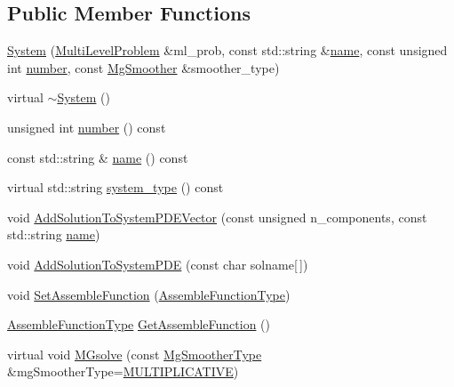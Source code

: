 \subsection*{Public Member Functions}
\begin{DoxyCompactItemize}
\item 
\mbox{\hyperlink{classfemus_1_1_system_ae4a9d3c1f17c10f42aa0935499a080cf}{System}} (\mbox{\hyperlink{classfemus_1_1_multi_level_problem}{Multi\+Level\+Problem}} \&ml\+\_\+prob, const std\+::string \&\mbox{\hyperlink{classfemus_1_1_system_a1a007c176529dae649887bbd1cb46103}{name}}, const unsigned int \mbox{\hyperlink{classfemus_1_1_system_a28f5c7f6286dd597ae28a8923c8dca11}{number}}, const \mbox{\hyperlink{_mg_smoother_enum_8hpp_a4d11c2ff93e2f0f440c879a9c40cda71}{Mg\+Smoother}} \&smoother\+\_\+type)
\item 
virtual \mbox{\hyperlink{classfemus_1_1_system_a9daeda058e7ad95e42816969019e4aac}{$\sim$\+System}} ()
\item 
unsigned int \mbox{\hyperlink{classfemus_1_1_system_a28f5c7f6286dd597ae28a8923c8dca11}{number}} () const
\item 
const std\+::string \& \mbox{\hyperlink{classfemus_1_1_system_a1a007c176529dae649887bbd1cb46103}{name}} () const
\item 
virtual std\+::string \mbox{\hyperlink{classfemus_1_1_system_a8cdcdcaf37dc4985be99dbb0a5ad8efa}{system\+\_\+type}} () const
\item 
void \mbox{\hyperlink{classfemus_1_1_system_a54c8e2e5af5b8b63ecdf7720bd93452d}{Add\+Solution\+To\+System\+P\+D\+E\+Vector}} (const unsigned n\+\_\+components, const std\+::string \mbox{\hyperlink{classfemus_1_1_system_a1a007c176529dae649887bbd1cb46103}{name}})
\item 
void \mbox{\hyperlink{classfemus_1_1_system_a606e07526d7a0d31eed638404ee2ed24}{Add\+Solution\+To\+System\+P\+DE}} (const char solname\mbox{[}$\,$\mbox{]})
\item 
void \mbox{\hyperlink{classfemus_1_1_system_a42a5b5b5d2c7673b1d4c896762d8db9e}{Set\+Assemble\+Function}} (\mbox{\hyperlink{classfemus_1_1_system_ae71fa78abbc4b3efe8ef1dc057275b9b}{Assemble\+Function\+Type}})
\item 
\mbox{\hyperlink{classfemus_1_1_system_ae71fa78abbc4b3efe8ef1dc057275b9b}{Assemble\+Function\+Type}} \mbox{\hyperlink{classfemus_1_1_system_a6ea05a107d1946ab9685aae7d228afb6}{Get\+Assemble\+Function}} ()
\item 
virtual void \mbox{\hyperlink{classfemus_1_1_system_a83f9e595297c01ddbdf19b6aadc983a7}{M\+Gsolve}} (const \mbox{\hyperlink{_mg_type_enum_8hpp_aec11e12c1f11a6ad959d3280ae0ee9a8}{Mg\+Smoother\+Type}} \&mg\+Smoother\+Type=\mbox{\hyperlink{_mg_type_enum_8hpp_aec11e12c1f11a6ad959d3280ae0ee9a8a2618be531dddb3647be5874ddcae5164}{M\+U\+L\+T\+I\+P\+L\+I\+C\+A\+T\+I\+VE}})

\end{DoxyCompactItemize}
